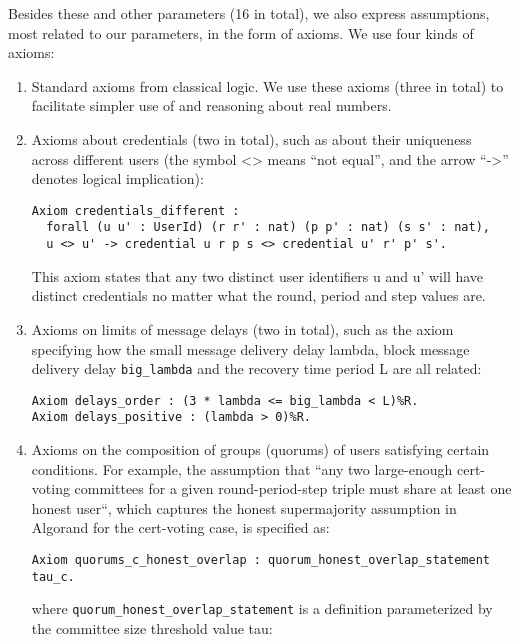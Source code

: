 Besides these and other parameters (16 in total), we also express assumptions, most related to our parameters, in the form of axioms. We use four kinds of axioms: 
\begin{enumerate}
\item Standard axioms from classical logic. We use these axioms (three in total) to facilitate simpler use of and reasoning about real numbers.

\item Axioms about credentials (two in total), such as about their uniqueness across different users (the symbol <> means “not equal”, and the arrow “->” denotes logical implication): 

\begin{lstlisting}[language=Coq]
Axiom credentials_different :
  forall (u u' : UserId) (r r' : nat) (p p' : nat) (s s' : nat),
  u <> u' -> credential u r p s <> credential u' r' p' s'.
\end{lstlisting}

This axiom states that any two distinct user identifiers u and u’ will have distinct credentials no matter what the round, period and step values are.

\item Axioms on limits of message delays (two in total), such as the axiom specifying how the small message delivery delay lambda, block message delivery delay \lstinline{big_lambda} and the recovery time period L are all related:

\begin{lstlisting}[language=Coq]
Axiom delays_order : (3 * lambda <= big_lambda < L)%R.
Axiom delays_positive : (lambda > 0)%R.
\end{lstlisting}

\item Axioms on the composition of groups (quorums) of users satisfying certain conditions. For example, the assumption that “any two large-enough cert-voting committees for a given round-period-step triple must share at least one honest user“, which captures the honest supermajority assumption in Algorand for the cert-voting case, is specified as:

\begin{lstlisting}[language=Coq]
Axiom quorums_c_honest_overlap : quorum_honest_overlap_statement tau_c.
\end{lstlisting}

where \lstinline{quorum_honest_overlap_statement} is a definition parameterized by the committee size threshold value tau:


\end{enumerate}
